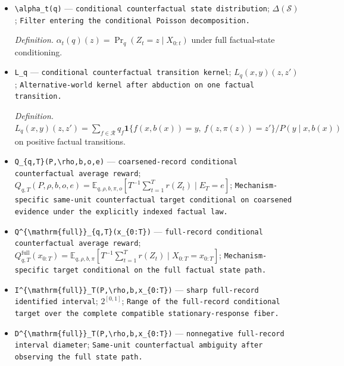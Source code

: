 \documentclass{article}
\begin{document}
\begin{itemize}
  \item \texttt{\textbackslash{}\allowbreak{}alpha\_\allowbreak{}t(q)} --- \texttt{conditional counterfactual state distribution}; \(\Delta(\mathcal S)\); \texttt{Filter entering the conditional Poisson decomposition.}
  \par\smallskip\noindent\emph{Definition.} \(\alpha_t(q)(z)=\Pr_q(Z_t=z\mid X_{0:t})\) under full factual-state conditioning.
  \item \texttt{L\_\allowbreak{}q} --- \texttt{conditional counterfactual transition kernel}; \(L_q(x,y)(z,z')\); \texttt{Alternative-\allowbreak{}world kernel after abduction on one factual transition.}
  \par\smallskip\noindent\emph{Definition.} \(L_q(x,y)(z,z')=\sum_{f\in\mathcal R}q_f\mathbf 1\{f(x,b(x))=y,\ f(z,\pi(z))=z'\}/P(y\mid x,b(x))\) on positive factual transitions.
  \item \texttt{Q\_\allowbreak{}\{q,\allowbreak{}T\}\allowbreak{}(P,\allowbreak{}\textbackslash{}\allowbreak{}rho,\allowbreak{}b,\allowbreak{}o,\allowbreak{}e)} --- \texttt{coarsened-\allowbreak{}record conditional counterfactual average reward}; \(Q_{q,T}(P,\rho,b,o,e)=\mathbb E_{q,\rho,b,\pi,o}[T^{-1}\sum_{t=1}^T r(Z_t)\mid E_T=e]\); \texttt{Mechanism-\allowbreak{}specific same-\allowbreak{}unit counterfactual target conditional on coarsened evidence under the explicitly indexed factual law.}
  \item \texttt{Q\textasciicircum{}\{\textbackslash{}\allowbreak{}mathrm\{full\}\allowbreak{}\}\allowbreak{}\_\allowbreak{}\{q,\allowbreak{}T\}\allowbreak{}(x\_\allowbreak{}\{0:\allowbreak{}T\}\allowbreak{})} --- \texttt{full-\allowbreak{}record conditional counterfactual average reward}; \(Q^{\mathrm{full}}_{q,T}(x_{0:T})=\mathbb E_{q,\rho,b,\pi}[T^{-1}\sum_{t=1}^T r(Z_t)\mid X_{0:T}=x_{0:T}]\); \texttt{Mechanism-\allowbreak{}specific target conditional on the full factual state path.}
  \item \texttt{I\textasciicircum{}\{\textbackslash{}\allowbreak{}mathrm\{full\}\allowbreak{}\}\allowbreak{}\_\allowbreak{}T(P,\allowbreak{}\textbackslash{}\allowbreak{}rho,\allowbreak{}b,\allowbreak{}x\_\allowbreak{}\{0:\allowbreak{}T\}\allowbreak{})} --- \texttt{sharp full-\allowbreak{}record identified interval}; \(2^{[0,1]}\); \texttt{Range of the full-\allowbreak{}record conditional target over the complete compatible stationary-\allowbreak{}response fiber.}
  \item \texttt{D\textasciicircum{}\{\textbackslash{}\allowbreak{}mathrm\{full\}\allowbreak{}\}\allowbreak{}\_\allowbreak{}T(P,\allowbreak{}\textbackslash{}\allowbreak{}rho,\allowbreak{}b,\allowbreak{}x\_\allowbreak{}\{0:\allowbreak{}T\}\allowbreak{})} --- \texttt{nonnegative full-\allowbreak{}record interval diameter}; \texttt{Same-\allowbreak{}unit counterfactual ambiguity after observing the full state path.}

\end{itemize}
\end{document}
